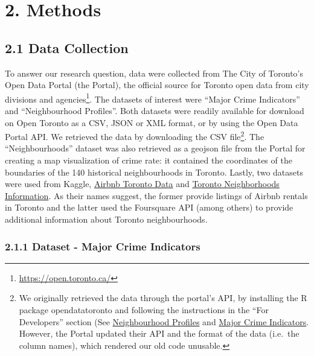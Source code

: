 \documentclass[
]{article}
\begin{document}
\hypertarget{methods}{%
\section{2. Methods}\label{methods}}

\hypertarget{data-collection}{%
\subsection{2.1 Data Collection}\label{data-collection}}

To answer our research question, data were collected from The City of
Toronto's Open Data Portal (the Portal), the official source for Toronto
open data from city divisions and agencies\footnote{\url{https://open.toronto.ca/}}.
The datasets of interest were ``Major Crime Indicators'' and
``Neighbourhood Profiles''. Both datasets were readily available for
download on Open Toronto as a CSV, JSON or XML format, or by using the
Open Data Portal API. We retrieved the data by downloading the CSV
file\footnote{We originally retrieved the data through the portal's API,
  by installing the R package opendatatoronto and following the
  instructions in the ``For Developers'' section (See
  \href{https://open.toronto.ca/dataset/neighbourhood-profiles/}{Neighbourhood
  Profiles} and
  \href{https://open.toronto.ca/dataset/major-crime-indicators/}{Major
  Crime Indicators}. However, the Portal updated their API and the
  format of the data (i.e.~the column names), which rendered our old
  code unusable.}. The ``Neighbourhoods'' dataset was also retrieved as
a geojson file from the Portal for creating a map visualization of crime
rate: it contained the coordinates of the boundaries of the 140
historical neighbourhoods in Toronto. Lastly, two datasets were used
from Kaggle,
\href{https://www.kaggle.com/datasets/suchow32/airbnb-toronto-data}{Airbnb
Toronto Data} and
\href{https://www.kaggle.com/datasets/youssef19/toronto-neighborhoods-inforamtion}{Toronto
Neighborhoods Information}. As their names suggest, the former provide
listings of Airbnb rentals in Toronto and the latter used the Foursquare
API (among others) to provide additional information about Toronto
neighbourhoods.

\hypertarget{dataset---major-crime-indicators}{%
\subsubsection{2.1.1 Dataset - Major Crime
Indicators}\label{dataset---major-crime-indicators}}
\end{document}
